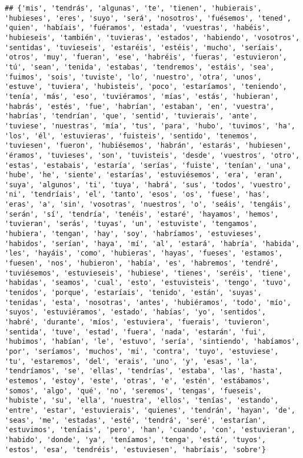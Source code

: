 \documentclass[
]{article}
\begin{document}
\begin{verbatim}
## {'mis', 'tendrás', 'algunas', 'te', 'tienen', 'hubierais', 'hubieses', 'eres', 'suyo', 'será', 'nosotros', 'fuésemos', 'tened', 'quien', 'habíais', 'fuéramos', 'estada', 'vuestras', 'habéis', 'hubieseis', 'también', 'tuvieras', 'estados', 'habiendo', 'vosotros', 'sentidas', 'tuvieseis', 'estaréis', 'estéis', 'mucho', 'seríais', 'otros', 'muy', 'fueran', 'ese', 'habréis', 'fueras', 'estuvieron', 'tú', 'sean', 'tenida', 'estabas', 'tendremos', 'estáis', 'sea', 'fuimos', 'sois', 'tuviste', 'lo', 'nuestro', 'otra', 'unos', 'estuve', 'tuviera', 'hubisteis', 'poco', 'estaríamos', 'teniendo', 'tenía', 'más', 'eso', 'tuviéramos', 'mías', 'estás', 'hubieran', 'habrás', 'estés', 'fue', 'habrían', 'estaban', 'en', 'vuestra', 'habrías', 'tendrían', 'que', 'sentid', 'tuvierais', 'ante', 'tuviese', 'nuestras', 'mía', 'tus', 'para', 'hubo', 'tuvimos', 'ha', 'los', 'él', 'estuvieras', 'fuisteis', 'sentido', 'tenemos', 'tuviesen', 'fueron', 'hubiésemos', 'habrán', 'estarás', 'hubiesen', 'éramos', 'tuvieses', 'son', 'tuvisteis', 'desde', 'vuestros', 'otro', 'estas', 'estabais', 'estaría', 'serías', 'fuiste', 'tenían', 'una', 'hube', 'he', 'siente', 'estarías', 'estuviésemos', 'era', 'eran', 'suya', 'algunos', 'ti', 'tuya', 'habrá', 'sus', 'todos', 'vuestro', 'ni', 'tendríais', 'el', 'tanto', 'esos', 'os', 'fuese', 'has', 'eras', 'a', 'sin', 'vosotras', 'nuestros', 'o', 'seáis', 'tengáis', 'serán', 'sí', 'tendría', 'tenéis', 'estaré', 'hayamos', 'hemos', 'tuvieran', 'serás', 'tuyas', 'un', 'estuviste', 'tengamos', 'hubiera', 'tengan', 'hay', 'soy', 'habríamos', 'estuvieses', 'habidos', 'serían', 'haya', 'mí', 'al', 'estará', 'habría', 'habida', 'les', 'hayáis', 'como', 'hubieras', 'hayas', 'fueses', 'estamos', 'fuesen', 'nos', 'hubieron', 'había', 'es', 'habremos', 'tendré', 'tuviésemos', 'estuvieseis', 'hubiese', 'tienes', 'seréis', 'tiene', 'habidas', 'seamos', 'cual', 'esto', 'estuvisteis', 'tengo', 'tuvo', 'tenidos', 'porque', 'estaríais', 'tenido', 'están', 'suyas', 'tenidas', 'esta', 'nosotras', 'antes', 'hubiéramos', 'todo', 'mío', 'suyos', 'estuviéramos', 'estado', 'habías', 'yo', 'sentidos', 'habré', 'durante', 'míos', 'estuviera', 'fuerais', 'tuvieron', 'sentida', 'tuve', 'estad', 'fuera', 'nada', 'estarán', 'fui', 'hubimos', 'habían', 'le', 'estuvo', 'sería', 'sintiendo', 'habíamos', 'por', 'seríamos', 'muchos', 'mi', 'contra', 'tuyo', 'estuviese', 'tu', 'estaremos', 'del', 'erais', 'uno', 'y', 'esas', 'la', 'tendríamos', 'se', 'ellas', 'tendrías', 'estaba', 'las', 'hasta', 'estemos', 'estoy', 'este', 'otras', 'e', 'estén', 'estábamos', 'somos', 'algo', 'qué', 'no', 'seremos', 'tengas', 'fueseis', 'hubiste', 'su', 'ella', 'nuestra', 'ellos', 'tenías', 'estando', 'entre', 'estar', 'estuvierais', 'quienes', 'tendrán', 'hayan', 'de', 'seas', 'me', 'estadas', 'esté', 'tendrá', 'seré', 'estarían', 'estuvimos', 'teníais', 'pero', 'han', 'cuando', 'con', 'estuvieran', 'habido', 'donde', 'ya', 'teníamos', 'tenga', 'está', 'tuyos', 'estos', 'esa', 'tendréis', 'estuviesen', 'habríais', 'sobre'}
\end{verbatim}
\end{document}
